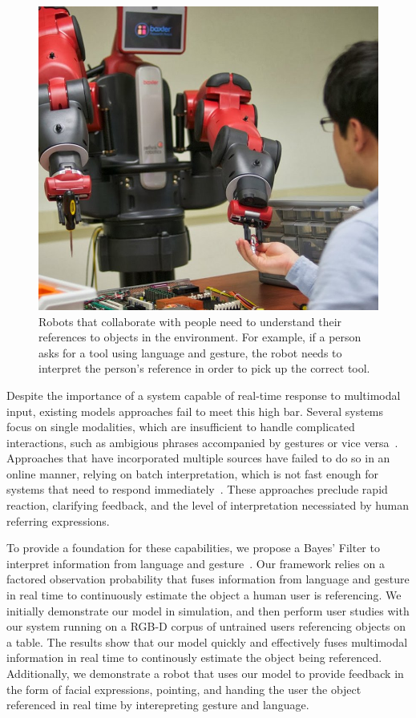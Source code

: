 \documentclass[a4paper, 11pt]{article} %
\begin{document}
\begin{figure}[h]
\centering
\includegraphics[width=0.3\linewidth]{images/baxter_scene_cropped.jpg}
\caption{Robots that collaborate with people need to understand their
  references to objects in the environment.  For example, if a person
  asks for a tool using language and gesture, the robot needs to
  interpret the person's reference in order to pick up the correct
  tool.\label{fig:example}}
\end{figure}

Despite the importance of a system capable of real-time response to multimodal input, existing models approaches fail to meet this high bar. Several systems focus on single modalities, which are insufficient to handle complicated interactions, such as ambigious phrases accompanied by gestures or vice versa~\citep{tellex11, kollar10}. Approaches that have incorporated multiple sources have failed to do so in an online manner, relying on batch interpretation, which is not fast enough for systems that need to respond immediately~\citep{matuszek14}. These approaches preclude rapid reaction, clarifying feedback, and the level of interpretation necessiated by human referring expressions.

To provide a foundation for these capabilities, we propose a Bayes' Filter to interpret information from language and gesture~\citep{thrun08}. Our framework relies on a factored observation probability that fuses information from language and gesture in real time to continuously estimate the object a human user is referencing. We initially demonstrate our model in simulation, and then perform user studies with our system running on a RGB-D corpus of untrained users referencing objects on a table. The results show that our model quickly and effectively fuses multimodal information in real time to continously estimate the object being referenced. Additionally, we demonstrate a robot that uses our model to provide feedback in the form of facial expressions, pointing, and handing the user the object referenced in real time by interepreting gesture and language.
\end{document}
